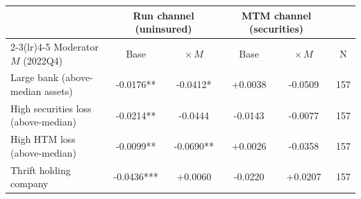 \begin{tabular}{lccccc}
\toprule
& \multicolumn{2}{c}{Run channel (uninsured)} & \multicolumn{2}{c}{MTM channel (securities)} & \\
\cmidrule(lr){2-3}\cmidrule(lr){4-5}
Moderator $M$ (2022Q4) & Base & $\times\,M$ & Base & $\times\,M$ & N \\
\midrule
Large bank (above-median assets) & -0.0176** & -0.0412* & +0.0038 & -0.0509 & 157 \\
High securities loss (above-median) & -0.0214** & -0.0444 & -0.0143 & -0.0077 & 157 \\
High HTM loss (above-median) & -0.0099** & -0.0690** & +0.0026 & -0.0358 & 157 \\
Thrift holding company & -0.0436*** & +0.0060 & -0.0220 & +0.0207 & 157 \\
\bottomrule
\end{tabular}